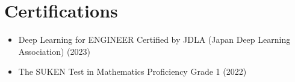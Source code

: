 \documentclass{article}
\begin{document}
\section{Certifications}

\begin{itemize}
  \item Deep Learning for ENGINEER Certified by JDLA (Japan Deep Learning Association) (2023)
  \item The SUKEN Test in Mathematics Proficiency Grade 1 (2022)
\end{itemize}
\end{document}
